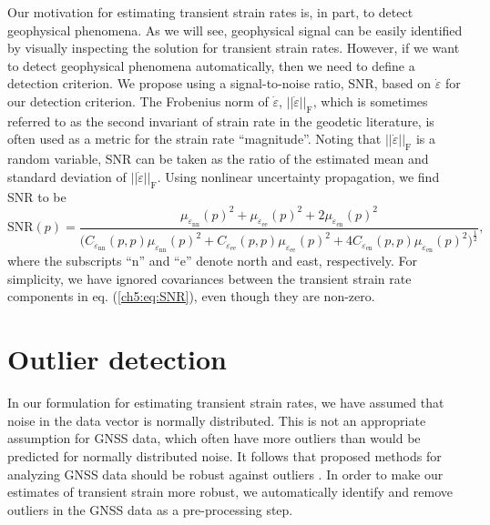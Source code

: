Our motivation for estimating transient strain rates is, in part, to
detect geophysical phenomena. As we will see, geophysical signal can
be easily identified by visually inspecting the solution for transient
strain rates. However, if we want to detect geophysical phenomena
automatically, then we need to define a detection criterion. We
propose using a signal-to-noise ratio, SNR, based on $\dot\varepsilon$
for our detection criterion. The Frobenius norm of $\dot\varepsilon$,
$||\dot\varepsilon||_\mathrm{F}$, which is sometimes referred to as
the second invariant of strain rate in the geodetic literature, is
often used as a metric for the strain rate ``magnitude''. Noting that
$||\dot\varepsilon||_\mathrm{F}$ is a random variable, SNR can be
taken as the ratio of the estimated mean and standard deviation of
$||\dot\varepsilon||_\mathrm{F}$. Using nonlinear uncertainty
propagation, we find SNR to be
\begin{equation}\label{ch5:eq:SNR}
\mathrm{SNR}(p) = \frac{\mu_{\dot\varepsilon_\mathrm{nn}}(p)^2 +
                        \mu_{\dot\varepsilon_\mathrm{ee}}(p)^2 +
                        2\mu_{\dot\varepsilon_\mathrm{en}}(p)^2}
                       {\big(C_{\dot\varepsilon_\mathrm{nn}}(p,p)\mu_{\dot\varepsilon_\mathrm{nn}}(p)^2 + 
                              C_{\dot\varepsilon_\mathrm{ee}}(p,p)\mu_{\dot\varepsilon_\mathrm{ee}}(p)^2 + 
                              4C_{\dot\varepsilon_\mathrm{en}}(p,p)\mu_{\dot\varepsilon_\mathrm{en}}(p)^2
                        \big)^{\frac{1}{2}}}
,
\end{equation}
where the subscripts ``n'' and ``e'' denote north and east,
respectively. For simplicity, we have ignored covariances between the
transient strain rate components in eq. (\ref{ch5:eq:SNR}), even
though they are non-zero.

\section{Outlier detection}\label{ch5:sec:Outlier}
In our formulation for estimating transient strain rates, we have
assumed that noise in the data vector is normally distributed. This is
not an appropriate assumption for GNSS data, which often have more
outliers than would be predicted for normally distributed noise. It
follows that proposed methods for analyzing GNSS data should be robust
against outliers \citep[e.g.,][]{Blewitt2016}. In order to make our
estimates of transient strain more robust, we automatically identify
and remove outliers in the GNSS data as a pre-processing step.


